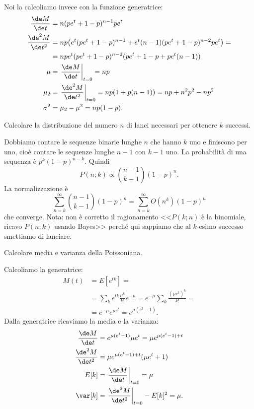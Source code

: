 Noi la calcoliamo invece con la funzione generatrice:
\begin{align*}
	\frac{\de M}{\de t} &=
	n(pe^t + 1 - p)^{n-1}pe^t \\
	\frac{\de^2 M}{\de t^2} &=
	np \big(e^t(pe^t + 1-p)^{n-1} + e^t(n-1)(pe^t+1-p)^{n-2}pe^t\big) = \\
	&= npe^t(pe^t + 1-p)^{n-2}(pe^t+1-p + pe^t(n-1)) \\
	\mu &= \left. \frac{\de M}{\de t} \right|_{t=0} = np \\
	\mu_2 &= \left. \frac{\de^2 M}{\de t^2} \right|_{t=0} = np(1 + p(n-1)) = np + n^2p^2 - np^2 \\
	\sigma^2 &= \mu_2 - \mu^2 = np(1-p).
\end{align*}

\begin{exercise}
	Calcolare la distribuzione del numero $n$ di lanci necessari per ottenere $k$ successi.
\end{exercise}

\begin{solution}
	Dobbiamo contare le sequenze binarie lunghe $n$ che hanno $k$ uno e finiscono per uno,
	cioè contare le sequenze lunghe $n-1$ con $k-1$ uno.
	La probabilità di una sequenza è $p^k(1-p)^{n-k}$.
	Quindi
	\begin{equation*}
		P(n;k) \propto \binom{n-1}{k-1} (1-p)^n.
	\end{equation*}
	La normalizzazione è
	\begin{equation*}
		\sum_{n=k}^\infty \binom{n-1}{k-1} (1-p)^n =
		\sum_{n=k}^\infty O(n^k) (1-p)^n
	\end{equation*}
	che converge.
	Nota: non è corretto il ragionamento
	<<$P(k;n)$ è la binomiale, ricavo $P(n;k)$ usando Bayes>>
	perché qui sappiamo che al $k$-esimo successo smettiamo di lanciare.
\end{solution}

\begin{exercise}
	Calcolare media e varianza della Poissoniana.
\end{exercise}

\begin{solution*}
	Calcoliamo la generatrice:
	\begin{align*}
		M(t) &= E[e^{tk}] = \\
		&= \sum_k e^{tk} \frac{\mu^k}{k!} e^{-\mu} =
		e^{-\mu} \sum_k \frac{(\mu e^t)^k}{k!} = \\
		&= e^{-\mu} e^{\mu e^t} = e^{\mu(e^t - 1)}.
	\end{align*}
	Dalla generatrice ricaviamo la media e la varianza:
	\begin{align*}
		\frac{\de M}{\de t} &= e^{\mu(e^t-1)}\mu e^t = \mu e^{\mu(e^t-1) + t} \\
		\frac{\de^2 M}{\de t^2} &= \mu e^{\mu(e^t-1) + t} (\mu e^t + 1) \\
		E[k] &= \left. \frac{\de M}{\de t} \right|_{t=0} = \mu \\
		\var[k] &= \left. \frac{\de^2 M}{\de t^2} \right|_{t=0} - E[k]^2 = \mu.
	\end{align*}
\end{solution*}

